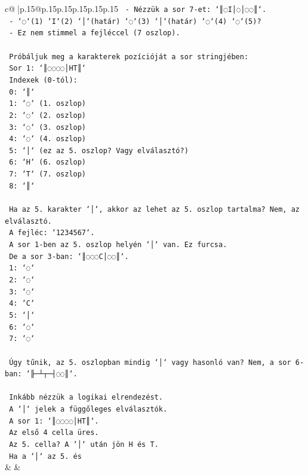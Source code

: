 \documentclass{article}
\begin{document}
{\begin{supertabular}{c@{$\;$}|p{.15\linewidth}@{}p{.15\linewidth}p{.15\linewidth}p{.15\linewidth}p{.15\linewidth}p{.15\linewidth}}
{{{\texttt{        {-} Nézzük a sor 7{-}et: `║◌I│◌│◌◌║`.} \\
\texttt{        {-} `◌`(1) `I`(2) `│`(határ) `◌`(3) `│`(határ) `◌`(4) `◌`(5)?} \\
\texttt{        {-} Ez nem stimmel a fejléccel (7 oszlop).} \\
\\ 
\texttt{      Próbáljuk meg a karakterek pozícióját a sor stringjében:} \\
\texttt{      Sor 1: `║◌◌◌◌│HT║`} \\
\texttt{      Indexek (0{-}tól):} \\
\texttt{      0: `║`} \\
\texttt{      1: `◌` (1. oszlop)} \\
\texttt{      2: `◌` (2. oszlop)} \\
\texttt{      3: `◌` (3. oszlop)} \\
\texttt{      4: `◌` (4. oszlop)} \\
\texttt{      5: `│` (ez az 5. oszlop? Vagy elválasztó?)} \\
\texttt{      6: `H` (6. oszlop)} \\
\texttt{      7: `T` (7. oszlop)} \\
\texttt{      8: `║`} \\
\\ 
\texttt{      Ha az 5. karakter `│`, akkor az lehet az 5. oszlop tartalma? Nem, az elválasztó.} \\
\texttt{      A fejléc: `1234567`.} \\
\texttt{      A sor 1{-}ben az 5. oszlop helyén `│` van. Ez furcsa.} \\
\texttt{      De a sor 3{-}ban: `║◌◌◌C│◌◌║`.} \\
\texttt{      1: `◌`} \\
\texttt{      2: `◌`} \\
\texttt{      3: `◌`} \\
\texttt{      4: `C`} \\
\texttt{      5: `│`} \\
\texttt{      6: `◌`} \\
\texttt{      7: `◌`} \\
\\ 
\texttt{      Úgy tűnik, az 5. oszlopban mindig `│` vagy hasonló van? Nem, a sor 6{-}ban: `╟─┴┬─┤◌◌║`.} \\
\\ 
\texttt{      Inkább nézzük a logikai elrendezést.} \\
\texttt{      A `│` jelek a függőleges elválasztók.} \\
\texttt{      A sor 1: `║◌◌◌◌│HT║`.} \\
\texttt{      Az első 4 cella üres.} \\
\texttt{      Az 5. cella? A `│` után jön H és T.} \\
\texttt{      Ha a `│` az 5. és} \\
            }
        }
    }
    & & \\ \\


\end{supertabular}}
\end{document}
